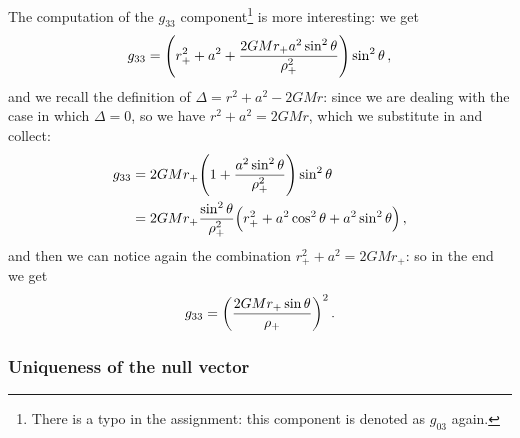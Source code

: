 \documentclass[main.tex]{subfiles}
\begin{document}
The computation of the \(g_{33} \) component\footnote{There is a typo in the assignment: this component is denoted as \(g_{03}\) again.} is more interesting: we get 
%
\begin{align}
  g_{33} = \qty( r_+^2 + a^2 + \frac{2GMr_{+} a^2 \sin^2\theta }{\rho_{+}^2}) \sin^2 \theta 
\,,
\end{align}
%
and we recall the definition of \(\Delta = r^2 + a^2 - 2GM r\): since we are dealing with the case in which \(\Delta = 0\), so we have \(r^2 + a^2 = 2GMr\), which we substitute in and collect:
%
\begin{align}
  g_{33} &= 2GMr_{+} \qty(1 + \frac{a^2 \sin^2\theta }{\rho_{+}^2}) \sin^2\theta \\
  &= 2GMr_{+} \frac{\sin^2 \theta }{\rho_{+}^2} \qty(r_{+}^2 + a^2 \cos^2 \theta + a^2 \sin^2\theta )
\,,
\end{align}
%
and then we can notice again the combination \(r_{+}^2 + a^2 = 2GMr_{+}\): so in the end we get 
%
\begin{align}
  g_{33} = \qty(\frac{2GMr_{+} \sin \theta }{\rho_{+}})^2
\,.
\end{align}

\subsubsection{Uniqueness of the null vector}
\end{document}
